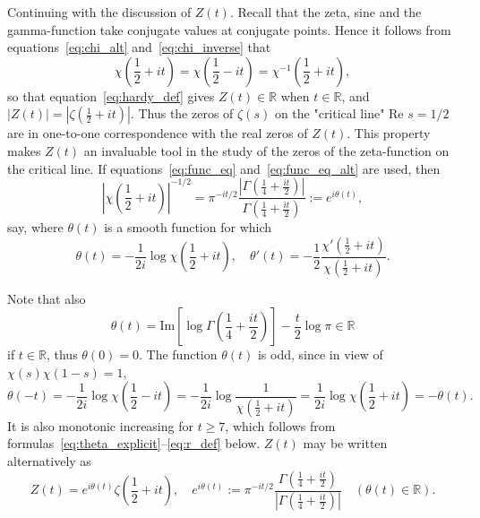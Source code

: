 \documentclass[11pt]{article}
\begin{document}
Continuing with the discussion of $Z(t)$. Recall that the zeta, sine and the gamma-function take conjugate values at conjugate points. Hence it follows from equations~\eqref{eq:chi_alt} and~\eqref{eq:chi_inverse} that
\begin{equation}\label{eq:chi_real}
\chi\left(\frac{1}{2} + it\right) = \chi\left(\frac{1}{2} - it\right) = \chi^{-1}\left(\frac{1}{2} + it\right),
\end{equation}
so that equation~\eqref{eq:hardy_def} gives $Z(t) \in \mathbb{R}$ when $t \in \mathbb{R}$, and $|Z(t)| = |\zeta(\frac{1}{2} + it)|$. Thus the zeros of $\zeta(s)$ on the "critical line" $\text{Re } s = 1/2$ are in one-to-one correspondence with the real zeros of $Z(t)$. This property makes $Z(t)$ an invaluable tool in the study of the zeros of the zeta-function on the critical line. If equations~\eqref{eq:func_eq} and~\eqref{eq:func_eq_alt} are used, then
\begin{equation}\label{eq:chi_phase}
\left| \chi\left(\frac{1}{2} + it\right) \right|^{-1/2} = \pi^{-it/2} \frac{\left| \Gamma\left(\frac{1}{4} + \frac{it}{2}\right) \right|}{\Gamma\left(\frac{1}{4} + \frac{it}{2}\right)} := e^{i\theta(t)},
\end{equation}
say, where $\theta(t)$ is a smooth function for which
\begin{equation}\label{eq:theta_def_alt}
\theta(t) = -\frac{1}{2i} \log \chi\left(\frac{1}{2} + it\right), \quad \theta'(t) = -\frac{1}{2} \frac{\chi'\left(\frac{1}{2} + it\right)}{\chi\left(\frac{1}{2} + it\right)}.
\end{equation}

Note that also
\begin{equation}\label{eq:theta_imag}
\theta(t) = \text{Im} \left[ \log \Gamma\left(\frac{1}{4} + \frac{it}{2}\right) \right] - \frac{t}{2} \log \pi \in \mathbb{R}
\end{equation}
if $t \in \mathbb{R}$, thus $\theta(0) = 0$. The function $\theta(t)$ is odd, since in view of $\chi(s)\chi(1-s) = 1$,
\begin{equation}\label{eq:theta_odd}
\theta(-t) = -\frac{1}{2i} \log \chi\left(\frac{1}{2} - it\right) = -\frac{1}{2i} \log \frac{1}{\chi\left(\frac{1}{2} + it\right)} = \frac{1}{2i} \log \chi\left(\frac{1}{2} + it\right) = -\theta(t).
\end{equation}
It is also monotonic increasing for $t \geq 7$, which follows from formulas~\eqref{eq:theta_explicit}--\eqref{eq:r_def} below. $Z(t)$ may be written alternatively as
\begin{equation}\label{eq:hardy_alt}
Z(t) = e^{i\theta(t)} \zeta\left(\frac{1}{2} + it\right), \quad e^{i\theta(t)} := \pi^{-it/2} \frac{\Gamma\left(\frac{1}{4} + \frac{it}{2}\right)}{\left| \Gamma\left(\frac{1}{4} + \frac{it}{2}\right) \right|} \quad (\theta(t) \in \mathbb{R}).
\end{equation}
\end{document}
